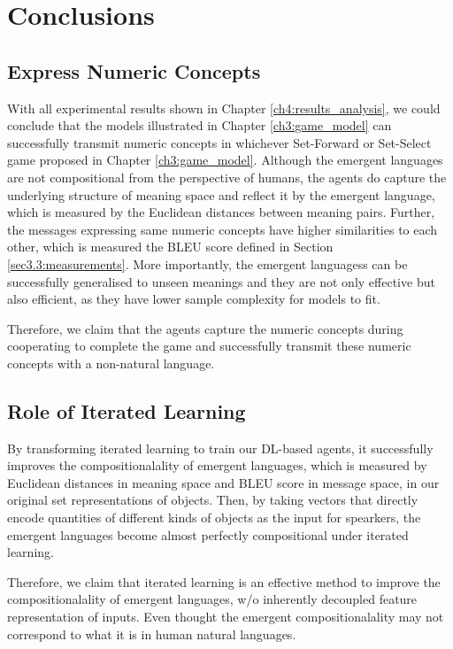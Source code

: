 \chapter{Conclusions}
\label{ch5:conclusion}

\section{Express Numeric Concepts}
\label{sec5.1:numeric_represent}

With all experimental results shown in Chapter \ref{ch4:results_analysis}, we could conclude that the models illustrated in Chapter \ref{ch3:game_model} can successfully transmit numeric concepts in whichever Set-Forward or Set-Select game proposed in Chapter \ref{ch3:game_model}. Although the emergent languages are not compositional from the perspective of humans, the agents do capture the underlying structure of meaning space and reflect it by the emergent language, which is measured by the Euclidean distances between meaning pairs. Further, the messages expressing same numeric concepts have higher similarities to each other, which is measured the BLEU score defined in Section \ref{sec3.3:measurements}. More importantly, the emergent languagess can be successfully generalised to unseen meanings and they are not only effective but also efficient, as they have lower sample complexity for models to fit.

Therefore, we claim that the agents capture the numeric concepts during cooperating to complete the game and successfully transmit these numeric concepts with a non-natural language.

\section{Role of Iterated Learning}
\label{sec5.2:iterated_learning}

By transforming iterated learning to train our DL-based agents, it successfully improves the compositionalality of emergent languages, which is measured by Euclidean distances in meaning space and BLEU score in message space, in our original set representations of objects. Then, by taking vectors that directly encode quantities of different kinds of objects as the input for spearkers, the emergent languages become almost perfectly compositional under iterated learning.

Therefore, we claim that iterated learning is an effective method to improve the compositionalality of emergent languages, w/o inherently decoupled feature representation of inputs. Even thought the emergent compositionalality may not correspond to what it is in human natural languages.

